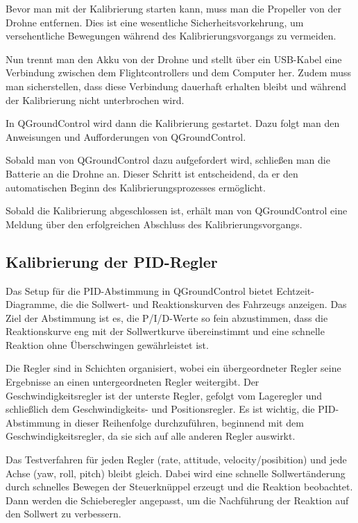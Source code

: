 Bevor man mit der Kalibrierung starten kann, muss man die Propeller von der Drohne entfernen. Dies ist eine wesentliche Sicherheitsvorkehrung, um versehentliche Bewegungen während des Kalibrierungsvorgangs zu vermeiden.

Nun trennt man den Akku von der Drohne und stellt über ein USB-Kabel eine Verbindung zwischen dem Flightcontrollers und dem Computer her. Zudem muss man sicherstellen, dass diese Verbindung dauerhaft erhalten bleibt und während der Kalibrierung nicht unterbrochen wird.

In QGroundControl wird dann die Kalibrierung gestartet. Dazu folgt man den Anweisungen und Aufforderungen von QGroundControl.

Sobald man von QGroundControl dazu aufgefordert wird, schließen man die Batterie an die Drohne an. Dieser Schritt ist entscheidend, da er den automatischen Beginn des Kalibrierungsprozesses ermöglicht.

Sobald die Kalibrierung abgeschlossen ist, erhält man von QGroundControl eine Meldung über den erfolgreichen Abschluss des Kalibrierungsvorgangs.

\subsection{Kalibrierung der PID-Regler}
Das Setup für die PID-Abstimmung in QGroundControl bietet Echtzeit-Diagramme, die die Sollwert- und Reaktionskurven des Fahrzeugs anzeigen. Das Ziel der Abstimmung ist es, die P/I/D-Werte so fein abzustimmen, dass die Reaktionskurve eng mit der Sollwertkurve übereinstimmt und eine schnelle Reaktion ohne Überschwingen gewährleistet ist.

Die Regler sind in Schichten organisiert, wobei ein übergeordneter Regler seine Ergebnisse an einen untergeordneten Regler weitergibt. Der Geschwindigkeitsregler ist der unterste Regler, gefolgt vom Lageregler und schließlich dem Geschwindigkeits- und Positionsregler. Es ist wichtig, die PID-Abstimmung in dieser Reihenfolge durchzuführen, beginnend mit dem Geschwindigkeitsregler, da sie sich auf alle anderen Regler auswirkt.

Das Testverfahren für jeden Regler (rate, attitude, velocity/posibition) und jede Achse (yaw, roll, pitch) bleibt gleich. Dabei wird eine schnelle Sollwertänderung durch schnelles Bewegen der Steuerknüppel erzeugt und die Reaktion beobachtet. Dann werden die Schieberegler angepasst, um die Nachführung der Reaktion auf den Sollwert zu verbessern.

